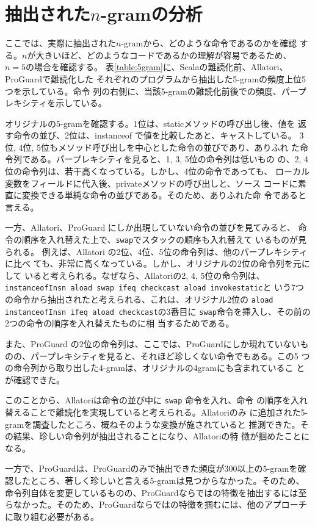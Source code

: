 \documentclass[12pt,twoside]{jbook}
\begin{document}
\section{抽出された$n$-gramの分析}

ここでは、実際に抽出された$n$-gramから、どのような命令であるのかを確認
する。$n$が大きいほど、どのようなコードであるかの理解が容易であるため、
$n=5$の場合を確認する。
%
表\ref{table:5gram}に、Scalaの難読化前、Allatori、ProGuardで難読化した
それぞれのプログラムから抽出した5-gramの頻度上位5つを示している。命令
列の右側に、当該5-gramの難読化前後での頻度、パープレキシティを示している。

オリジナルの5-gramを確認する。1位は、staticメソッドの呼び出し後、値を
返す命令の並び、2位は、instanceof で値を比較したあと、キャストしている。
3位, 4位, 5位もメソッド呼び出しを中心とした命令の並びであり、ありふれ
た命令列である。パープレキシティを見ると、1, 3, 5位の命令列は低いもの
の、2, 4位の命令列は、若干高くなっている。しかし、4位の命令であっても、
ローカル変数をフィールドに代入後、privateメソッドの呼び出しと、ソース
コードに素直に変換できる単純な命令の並びである。そのため、ありふれた命
令であると言える。

一方、Allatori、ProGuard にしか出現していない命令の並びを見てみると、
命令の順序を入れ替えた上で、\texttt{swap}でスタックの順序も入れ替えて
いるものが見られる。
%
例えば、Allatori の2位、4位、5位の命令列は、他のパープレキシティに比べ
ても、非常に高くなっている。しかし、オリジナルの2位の命令列を元にして
いると考えられる。なぜなら、Allatoriの2, 4, 5位の命令列は、
\texttt{instanceofInsn aload swap ifeq checkcast aload invokestatic}と
いう7つの命令から抽出されたと考えられる、これは、オリジナル2位の
\texttt{aload instanceofInsn ifeq aload checkcast}の3番目に
\texttt{swap}命令を挿入し、その前の2つの命令の順序を入れ替えたものに相
当するためである。

また、ProGuard の2位の命令列は、ここでは、ProGuardにしか現れていないも
のの、パープレキシティを見ると、それほど珍しくない命令でもある。この5
つの命令列から取り出した4-gramは、オリジナルの4gramにも含まれているこ
とが確認できた。

このことから、Allatoriは命令の並び中に \texttt{swap} 命令を入れ、命令
の順序を入れ替えることで難読化を実現していると考えられる。Allatoriのみ
に追加された5-gramを調査したところ、概ねそのような変換が施されていると
推測できた。その結果、珍しい命令列が抽出されることになり、Allatoriの特
徴が掴めたことになる。

一方で、ProGuardは、ProGuardのみで抽出できた頻度が300以上の$5$-gramを確
認したところ、著しく珍しいと言える5-gramは見つからなかった。そのため、
命令列自体を変更しているものの、ProGuardならではの特徴を抽出するには至
らなかった。そのため、ProGuardならではの特徴を掴むには、他のアプローチ
に取り組む必要がある。
\end{document}
